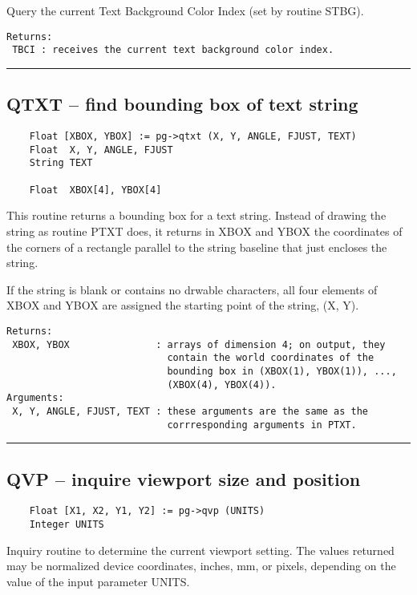 Query the current Text Background Color Index (set by routine STBG).

\begin{verbatim}
Returns:
 TBCI : receives the current text background color index.
\end{verbatim}

\hrule

\subsection*{QTXT -- find bounding box of text string }

\begin{verbatim}
    Float [XBOX, YBOX] := pg->qtxt (X, Y, ANGLE, FJUST, TEXT)
    Float  X, Y, ANGLE, FJUST
    String TEXT

    Float  XBOX[4], YBOX[4]
\end{verbatim}

This routine returns a bounding box for a text string.  Instead of
drawing the string as routine PTXT does, it returns in XBOX and YBOX
the coordinates of the corners of a rectangle parallel to the string
baseline that just encloses the string.

If the string is blank or contains no drwable characters, all four
elements of XBOX and YBOX are assigned the starting point of the
string, (X, Y).

\begin{verbatim}
Returns:
 XBOX, YBOX               : arrays of dimension 4; on output, they
                            contain the world coordinates of the
                            bounding box in (XBOX(1), YBOX(1)), ...,
                            (XBOX(4), YBOX(4)). 
Arguments:
 X, Y, ANGLE, FJUST, TEXT : these arguments are the same as the
                            corrresponding arguments in PTXT. 
\end{verbatim}

\hrule

\subsection*{QVP -- inquire viewport size and position }

\begin{verbatim}
    Float [X1, X2, Y1, Y2] := pg->qvp (UNITS)
    Integer UNITS
\end{verbatim}

Inquiry routine to determine the current viewport setting.  The values
returned may be normalized device coordinates, inches, mm, or pixels,
depending on the value of the input parameter UNITS.

